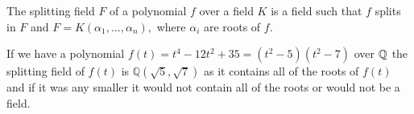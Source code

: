 \begin{definition}
    The splitting field $F$ of a polynomial $f$ over a field $K$ is a field such that $f$ splits in $F$ and $F = K(\alpha_1, \ldots, \alpha_n), $ where $\alpha_i$ are roots of $f$. 
\end{definition}


\begin{example}
	If we have a polynomial \(f(t) = t^4 - 12t^2 + 35 = (t^2 - 5) (t ^ 2 - 7)\) over $\mathbb Q$ the splitting field of \(f(t)\) is \(\mathbb{Q}(\sqrt{5},\sqrt{7})\) as it contains all of the roots of \(f(t)\) and if it was any smaller it would not contain all of the roots or would not be a field.
\end{example}

